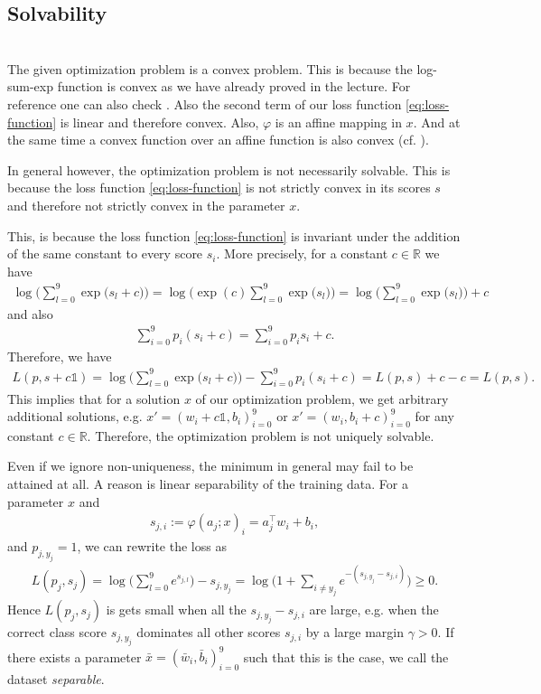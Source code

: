 \subsection{Solvability}\;\\
The given optimization problem is a convex problem. This is because the log-sum-exp function is convex as we have already proved in the lecture. For reference one can also check \cite[72,74]{Boyd2009}. 
Also the second term of our loss function \cref{eq:loss-function} is linear and therefore convex. Also, $\varphi$ is an affine mapping in $x$. And at the same time a convex function over an affine function is also convex (cf. \cite[67]{Boyd2009}).


In general however, the optimization problem is not necessarily solvable. This is because the loss function \cref{eq:loss-function} is not strictly convex in its scores $s$ and therefore not strictly convex in the parameter $x$. 

This, is because the loss function \cref{eq:loss-function} is invariant under the addition of the same constant to every score $s_i$. More precisely, for a constant $c \in \mathbb{R}$ we have
\begin{align*}
    \log\Big(\sum_{l=0}^{9} \exp\big(s_l + c\big)\Big) = \log\Big(\exp(c) \sum_{l=0}^{9} \exp\big(s_l\big)\Big) =\log\Big(\sum_{l=0}^{9} \exp\big(s_l\big)\Big) + c
\end{align*}
and also 
\begin{align*}
    \sum_{i=0}^{9} p_i(s_i + c) = \sum_{i=0}^{9} p_is_i + c.
\end{align*}
Therefore, we have 
\begin{align*}
    L(p,s+c\mathds{1}) = \log\Big(\sum_{l=0}^{9} \exp\big(s_l + c\big)\Big) - \sum_{i=0}^{9} p_i(s_i + c) = L(p,s) + c - c = L(p,s).
\end{align*}
This implies that for a solution $x$ of our optimization problem, we get arbitrary additional solutions, e.g. $x'=(w_i + c\mathds{1}, b_i)_{i=0}^9$ or $x'=(w_i, b_i + c)_{i=0}^9$ for any constant $c \in \mathbb{R}$. Therefore, the optimization problem is not uniquely solvable.

Even if we ignore non-uniqueness, the minimum in general may fail to be attained at all. A reason is linear separability of the training data. For a parameter $x$ and
\begin{align*}
s_{j,i} := \varphi(a_j;x)_i = a_j^\top w_i + b_i,
\end{align*}
and $p_{j,y_j}=1$, we can rewrite the loss as
\begin{align}
    \label{eq:loss-function-rewrite}
L(p_j,s_j)=\log\Big(\sum_{l=0}^9 e^{s_{j,l}}\Big)-s_{j,y_j}
= \log\Big(1+\sum_{i\neq y_j} e^{-(s_{j,y_j}-s_{j,i})}\Big) \geq 0.
\end{align}
Hence $L(p_j,s_j)$ is gets small when all the $s_{j,y_j}-s_{j,i}$ are large, e.g. when the correct class score $s_{j,y_j}$ dominates all other scores $s_{j,i}$ by a large margin $\gamma >0$. If there exists a parameter $\bar{x}=(\bar{w}_i, \bar{b}_i)_{i=0}^9$ such that this is the case, we call the dataset \emph{separable}.

